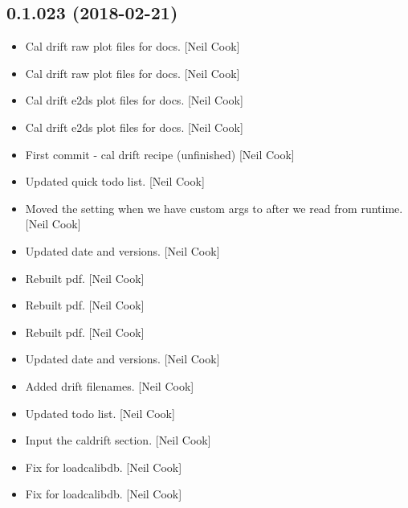 \documentclass[a4paper,10pt,english]{report}
\begin{document}
\subsection{0.1.023 (2018-02-21)}
\label{\detokenize{misc/changelog:id480}}\begin{itemize}
\item {} 
Cal drift raw plot files for docs. {[}Neil Cook{]}

\item {} 
Cal drift raw plot files for docs. {[}Neil Cook{]}

\item {} 
Cal drift e2ds plot files for docs. {[}Neil Cook{]}

\item {} 
Cal drift e2ds plot files for docs. {[}Neil Cook{]}

\item {} 
First commit - cal drift recipe (unfinished) {[}Neil Cook{]}

\item {} 
Updated quick todo list. {[}Neil Cook{]}

\item {} 
Moved the  setting when we have custom args
to after we read from runtime. {[}Neil Cook{]}

\item {} 
Updated date and versions. {[}Neil Cook{]}

\item {} 
Rebuilt pdf. {[}Neil Cook{]}

\item {} 
Rebuilt pdf. {[}Neil Cook{]}

\item {} 
Rebuilt pdf. {[}Neil Cook{]}

\item {} 
Updated date and versions. {[}Neil Cook{]}

\item {} 
Added drift filenames. {[}Neil Cook{]}

\item {} 
Updated todo list. {[}Neil Cook{]}

\item {} 
Input the caldrift section. {[}Neil Cook{]}

\item {} 
Fix for loadcalibdb. {[}Neil Cook{]}

\item {} 
Fix for loadcalibdb. {[}Neil Cook{]}

\end{itemize}
\end{document}
